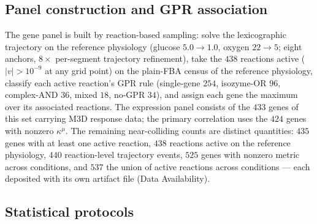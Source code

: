 \documentclass[11pt,a4paper]{article}
\theoremstyle{plain}
\theoremstyle{definition}
\theoremstyle{remark}
\newcommand{\kmu}{\kappa^{\mu}}
\begin{document}
\subsection{Panel construction and GPR association}

The gene panel is built by reaction-based sampling: solve the lexicographic trajectory on the reference physiology (glucose $5.0 \to
1.0$, oxygen $22 \to 5$; eight anchors, $8\times$ per-segment
trajectory refinement), take the $438$ reactions active
($|v| > 10^{-9}$ at any grid point) on the plain-FBA census of the
reference physiology,
classify each active reaction's GPR rule (single-gene $254$,
isozyme-OR $96$, complex-AND $36$, mixed $18$, no-GPR $34$), and
assign each gene the maximum over its associated reactions. The expression panel consists of the $433$ genes of this set carrying M3D response
data; the primary correlation uses the $424$ genes with nonzero
$\kmu$. The remaining near-colliding counts are distinct quantities: $435$ genes with at
least one active reaction, $438$ reactions active on the reference physiology, $440$
reaction-level trajectory events, $525$ genes with nonzero metric across conditions,
and $537$ the union of active reactions across conditions --- each deposited with its
own artifact file (Data Availability).

\subsection{Statistical protocols}
\end{document}
